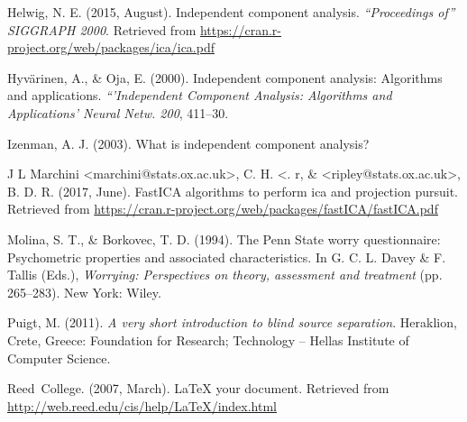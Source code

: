 \documentclass[12pt,twoside]{amherstthesis}
\begin{document}
  \noindent
  
  \setlength{\parindent}{-0.20in} \setlength{\leftskip}{0.20in}
  \setlength{\parskip}{8pt}
  
  \hypertarget{refs}{}
  \hypertarget{ref-icaR}{}
  Helwig, N. E. (2015, August). Independent component analysis.
  \emph{``Proceedings of'' SIGGRAPH 2000}. Retrieved from
  \url{https://cran.r-project.org/web/packages/ica/ica.pdf}
  
  \hypertarget{ref-Oja2000}{}
  Hyvärinen, A., \& Oja, E. (2000). Independent component analysis:
  Algorithms and applications. \emph{``'Independent Component Analysis:
  Algorithms and Applications' Neural Netw. 200}, 411--30.
  
  \hypertarget{ref-izenman2003}{}
  Izenman, A. J. (2003). What is independent component analysis?
  
  \hypertarget{ref-fastICA}{}
  J L Marchini \textless{}marchini@stats.ox.ac.uk\textgreater{}, C. H.
  \textless{}. r, \& \textless{}ripley@stats.ox.ac.uk\textgreater{}, B. D.
  R. (2017, June). FastICA algorithms to perform ica and projection
  pursuit. Retrieved from
  \url{https://cran.r-project.org/web/packages/fastICA/fastICA.pdf}
  
  \hypertarget{ref-Molina1994}{}
  Molina, S. T., \& Borkovec, T. D. (1994). The Penn State worry
  questionnaire: Psychometric properties and associated characteristics.
  In G. C. L. Davey \& F. Tallis (Eds.), \emph{Worrying: Perspectives on
  theory, assessment and treatment} (pp. 265--283). New York: Wiley.
  
  \hypertarget{ref-puigt2011}{}
  Puigt, M. (2011). \emph{A very short introduction to blind source
  separation}. Heraklion, Crete, Greece: Foundation for Research;
  Technology -- Hellas Institute of Computer Science.
  
  \hypertarget{ref-reedweb2007}{}
  Reed~College. (2007, March). LaTeX your document. Retrieved from
  \url{http://web.reed.edu/cis/help/LaTeX/index.html}


\end{document}
